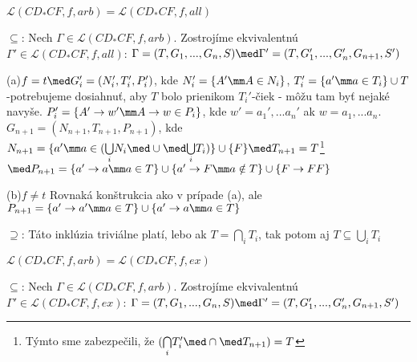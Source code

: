 \begin{dokaz}
\begin{description}
\item{}$\mathcal{L}(CD_*CF,f,arb)=\mathcal{L}(CD_*CF,f,all)$
\begin{description}
\item{$\subseteq$:} Nech $\Gamma\in \mathcal{L}(CD_*CF,f,arb)$. Zostrojíme ekvivalentnú
$\Gamma '\in \mathcal{L}(CD_*CF,f,all)$: $\Gamma = (T,G_1,...,G_n,S) \med \Gamma
'=(T,G_1',...,G_n',G_{n+1},S')$
\begin{description}
\item{(a)}$f=t \med G_i'=(N_i',T_i',P_i')$, kde $N_i'=\{A'\mm A\in N_i\}$, $T_i'=\{a'\mm a\in T_i\}\cup
T$ -potrebujeme dosiahnuť, aby $T$ bolo prienikom $T_i'$-čiek - môžu tam byť nejaké
navyše. $P_i'=\{A' \rightarrow w'\mm A\rightarrow w \in P_i\}$, kde $w'=a_1',...a_n'$ ak
$w=a_1,...a_n$. $G_{n+1}=(N_{n+1},T_{n+1},P_{n+1})$, kde $N_{n+1}=\{a'\mm a\in
(\underset{i}\bigcup N_i \med\cup\med\underset{i}\bigcup T_i)\}\cup\{F\}\med
T_{n+1}=T$\footnote{Týmto sme zabezpečili, že $(\underset{i}\bigcap T_i'\med\cap \med
T_{n+1})=T$}$\med P_{n+1}=\{a'\rightarrow a\mm a\in T\}\cup\{a'\rightarrow F\mm a\notin
T\}\cup\{F\rightarrow FF\}$
\item{(b)}$f\neq t$ Rovnaká konštrukcia ako v prípade (a), ale $P_{n+1}=\{a'\rightarrow
a'\mm a\in T\}\cup\{a'\rightarrow a\mm a\in T\}$
\end{description}
\item{$\supseteq$:} Táto inklúzia triviálne platí, lebo ak $T=\underset{i}\bigcap T_i$,
tak potom aj $T\subseteq\underset{i}\bigcup T_i$
\end{description}
\item{}$\mathcal{L}(CD_*CF,f,arb)=\mathcal{L}(CD_*CF,f,ex)$
\begin{description}
\item{$\subseteq$:} Nech $\Gamma\in \mathcal{L}(CD_*CF,f,arb)$. Zostrojíme ekvivalentnú
$\Gamma '\in \mathcal{L}(CD_*CF,f,ex)$: $\Gamma = (T,G_1,...,G_n,S) \med \Gamma
'=(T,G_1',...,G_n',G_{n+1},S')$
\end{description}
\end{description}
\end{dokaz}
